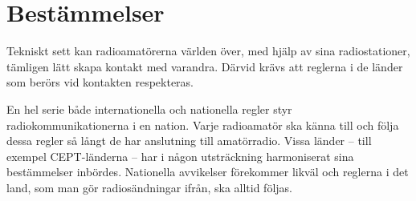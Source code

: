 \chapter{Bestämmelser}

Tekniskt sett kan radioamatörerna världen över, med hjälp av sina
radiostationer, tämligen lätt skapa kontakt med varandra.
Därvid krävs att reglerna i de länder som berörs vid kontakten respekteras.

En hel serie både internationella och nationella regler styr
radiokommunikationerna i en nation.
Varje radioamatör ska känna till och följa dessa regler så långt de har
anslutning till amatörradio.
Vissa länder -- till exempel CEPT-länderna -- har i någon utsträckning
harmoniserat sina bestämmelser inbördes.
Nationella avvikelser förekommer likväl och reglerna i det land, som man gör
radiosändningar ifrån, ska alltid följas.
